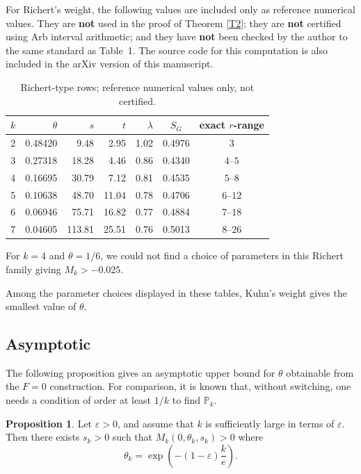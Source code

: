 \documentclass{amsart}
\theoremstyle{definition}
\newtheorem{prop}[dfn]{Proposition}
\theoremstyle{remark}
\newcommand{\1}{
    \bm{1}
}
\begin{document}
For Richert's weight, the following values are included only as reference numerical values. They are \textbf{not} used in the proof of Theorem \ref{T2}; they are \textbf{not} certified using Arb interval arithmetic; and they have \textbf{not} been checked by the author to the same standard as Table~1. 
The source code for this computation is also included in the arXiv version of this manuscript.

\begin{table}[ht]
\centering
\small
\setlength{\tabcolsep}{6pt}
\begin{tabular}{@{}crrrrcc@{}}
\toprule
\(k\) & \(\theta\) & \(s\) & \(t\) & \(\lambda\) & \(S_G\) & exact \(r\)-range\\
\midrule
2 & 0.48420 & 9.48   & 2.95  & 1.02 & 0.4976 & \(3\)\\
3 & 0.27318 & 18.28  & 4.46  & 0.86 & 0.4340 & \(4\text{--}5\)\\
4 & 0.16695 & 30.79  & 7.12  & 0.81 & 0.4535 & \(5\text{--}8\)\\
5 & 0.10638 & 48.70  & 11.04 & 0.78 & 0.4706 & \(6\text{--}12\)\\
6 & 0.06946 & 75.71  & 16.82 & 0.77 & 0.4884 & \(7\text{--}18\)\\
7 & 0.04605 & 113.81 & 25.51 & 0.76 & 0.5013 & \(8\text{--}26\)\\
\bottomrule
\end{tabular}
\caption{Richert-type rows; reference numerical values only, not certified.}
\end{table}

For \(k=4\) and \(\theta=1/6\), we could not find a choice of parameters in this Richert family giving $M_k>-0.025$.


\FloatBarrier



Among the parameter choices displayed in these tables, Kuhn's weight gives the smallest value of $\theta$.


\subsection{Asymptotic}

The following proposition gives an asymptotic upper bound for $\theta$ obtainable from the \(F=0\) construction.
For comparison, it is known that, without switching, one needs a condition of order at least \(1/k\) to find \(\mathbb{P}_k\). 
\begin{prop}
Let $\varepsilon>0$, and assume that $k$ is sufficiently large in terms of $\varepsilon$. 
Then there exists $s_k>0$ such that $M_k(0,\theta_k,s_k)>0$ where
\[
\theta_k=\exp\!\left(-(1-\varepsilon)\frac{k}{e}\right).
\]
\end{prop}
\end{document}
